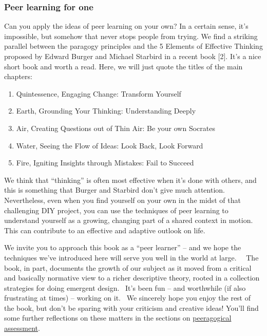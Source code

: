 \subsubsection{Peer learning for one}

Can you apply the ideas of peer learning on your own? In a certain
sense, it's impossible, but somehow that never stops people from trying.
We find a striking parallel between the paragogy principles and the 5
Elements of Effective Thinking proposed by Edward Burger and Michael
Starbird in a recent book {[}2{]}. It's a nice short book and worth a
read. Here, we will just quote the titles of the main chapters:

\begin{enumerate}
\itemsep1pt\parskip0pt
\item
  Quintessence, Engaging Change: Transform Yourself
\item
  Earth, Grounding Your Thinking: Understanding Deeply
\item
  Air, Creating Questions out of Thin Air: Be your own Socrates
\item
  Water, Seeing the Flow of Ideas: Look Back, Look Forward
\item
  Fire, Igniting Insights through Mistakes: Fail to Succeed
\end{enumerate}

We think that ``thinking'' is often most effective when it's done with
others, and this is something that Burger and Starbird don't give much
attention. Nevertheless, even when you find yourself on your own in the
midst of that challenging DIY project, you can use the techniques of
peer learning to understand yourself as a growing, changing part of a
shared context in motion. This can contribute to an effective and
adaptive outlook on life.

We invite you to approach this book as a ``peer learner'' -- and we hope
the techniques we've introduced here will serve you well in the world at
large.~~ The book, in part, documents the growth of our subject as it
moved from a critical and basically normative view to a richer
descriptive theory, rooted in a collection strategies for doing emergent
design.~ It's been fun -- and worthwhile (if also frustrating at times)
-- working on it.~ We sincerely hope you enjoy the rest of the book, but
don't be sparing with your criticism and creative ideas! You'll find
some further reflections on these matters in the sections on
\href{http://peeragogy.org/assessment/}{peeragogical assessment}.

